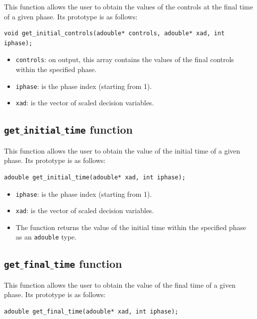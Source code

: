 \documentclass[a4paper,11pt]{report}    %
\begin{document}
This function allows the user to obtain the values of the controls
at the final time of a given phase. Its prototype is as follows:

\begin{verbatim}
void get_initial_controls(adouble* controls, adouble* xad, int iphase);
\end{verbatim}

\begin{itemize}
 \item \verb|controls|: on output, this array contains the values of the final controls within the specified phase.
 \item \verb|iphase|:  is the phase index (starting from 1).
 \item \verb|xad|: is the vector of scaled decision variables.
\end{itemize}



\subsection{ \texttt{get$\_$initial$\_$time} function}

This function allows the user to obtain the value of the initial time
of a given phase. Its prototype is as follows:

\begin{verbatim}
adouble get_initial_time(adouble* xad, int iphase);
\end{verbatim}

\begin{itemize}
 \item \verb|iphase|:  is the phase index (starting from 1).
 \item \verb|xad|: is the vector of scaled decision variables.
 \item The function returns the value of the initial time within the specified phase as an \verb|adouble| type.
\end{itemize}



\subsection{ \texttt{get$\_$final$\_$time} function}

This function allows the user to obtain the value of the final time
of a given phase. Its prototype is as follows:

\begin{verbatim}
adouble get_final_time(adouble* xad, int iphase);
\end{verbatim}
\end{document}

